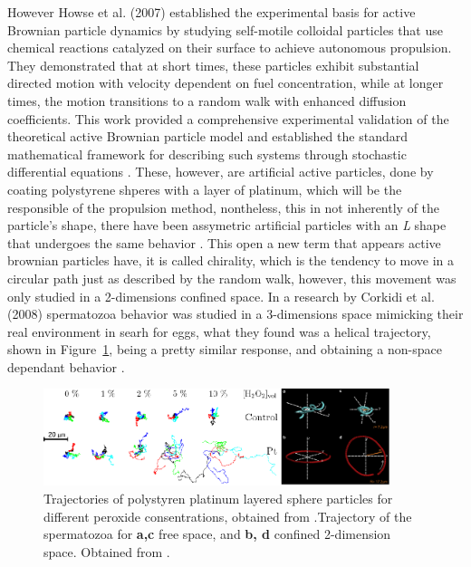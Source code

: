 However Howse et al. (2007) established the experimental basis for active Brownian particle dynamics by studying self-motile colloidal particles that use chemical reactions catalyzed on their surface to achieve autonomous propulsion. They demonstrated that at short times, these particles exhibit substantial directed motion with velocity dependent on fuel concentration, while at longer times, the motion transitions to a random walk with enhanced diffusion coefficients. This work provided a comprehensive experimental validation of the theoretical active Brownian particle model and established the standard mathematical framework for describing such systems through stochastic differential equations \cite{howse2007self, palacci2010sedimentation}. These, however, are artificial active particles, done by coating polystyrene shperes with a layer of platinum, which will be the responsible of the propulsion method, nontheless, this in not inherently of the particle's shape, there have been assymetric artificial particles with an \textit{L} shape that undergoes the same behavior \cite{kummel2013circular}. This open a new term that appears active brownian particles have, it is called chirality, which is the tendency to move in a circular path just as described by the random walk, however, this movement was only studied in a 2-dimensions confined space. In a research by Corkidi et al. (2008) spermatozoa behavior was studied in a 3-dimensions space mimicking their real environment in searh for eggs, what they found was a helical trajectory, shown in Figure~\ref{fig:corkidiexperiment}, being a pretty similar response, and obtaining a non-space dependant behavior \cite{corkidi2008tracking}. 


\begin{figure}[h]
  \begin{center}
    \includegraphics[width=0.90\textwidth]{figures/randomwalk.pdf}
  \end{center}
  \caption[Random Walk for active brownian particles.]{Trajectories of polystyren platinum layered sphere particles for different peroxide consentrations, obtained from \cite{howse2007self}.Trajectory of the spermatozoa for \textbf{a,c} free space, and \textbf{b, d} confined 2-dimension space. Obtained from \cite{corkidi2008tracking}.}\label{fig:corkidiexperiment}
\end{figure}




